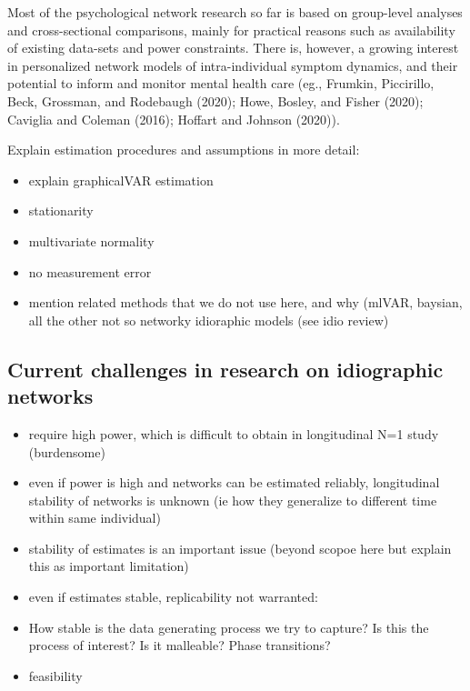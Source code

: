 \documentclass[
  english,
  man]{apa6}
\providecommand{\tightlist}{%
  \setlength{\itemsep}{0pt}\setlength{\parskip}{0pt}}
\begin{document}
Most of the psychological network research so far is based on group-level analyses and cross-sectional comparisons, mainly for practical reasons such as availability of existing data-sets and power constraints. There is, however, a growing interest in personalized network models of intra-individual symptom dynamics, and their potential to inform and monitor mental health care (eg., Frumkin, Piccirillo, Beck, Grossman, and Rodebaugh (2020); Howe, Bosley, and Fisher (2020); Caviglia and Coleman (2016); Hoffart and Johnson (2020)).

Explain estimation procedures and assumptions in more detail:

\begin{itemize}
\tightlist
\item
  explain graphicalVAR estimation
\item
  stationarity
\item
  multivariate normality
\item
  no measurement error
\item
  mention related methods that we do not use here, and why (mlVAR, baysian, all the other not so networky idioraphic models (see idio review)
\end{itemize}

\hypertarget{current-challenges-in-research-on-idiographic-networks}{%
\subsection{Current challenges in research on idiographic networks}\label{current-challenges-in-research-on-idiographic-networks}}

\begin{itemize}
\item
  require high power, which is difficult to obtain in longitudinal N=1 study (burdensome)
\item
  even if power is high and networks can be estimated reliably, longitudinal stability of networks is unknown (ie how they generalize to different time within same individual)
\item
  stability of estimates is an important issue (beyond scopoe here but explain this as important limitation)
\item
  even if estimates stable, replicability not warranted:
\item
  How stable is the data generating process we try to capture? Is this the process of interest? Is it malleable? Phase transitions?
\item
  feasibility
\end{itemize}
\end{document}
